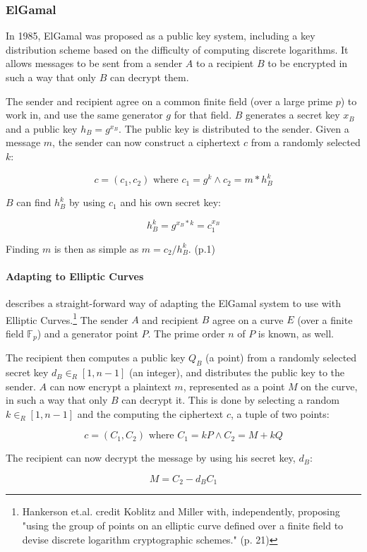 \subsubsection{ElGamal}

In 1985, ElGamal was proposed as a public key system, including a key distribution scheme based
on the difficulty of computing discrete logarithms. It allows messages to be sent from a sender
\(A\) to a recipient \(B\) to be encrypted in such a way that only \(B\) can decrypt them.

The sender and recipient agree on a common finite field (over a large prime \(p\)) to work in,
and use the same generator \(g\) for that field. \(B\) generates a secret key \(x_B\) and a public
key \(h_B = g^{x_B}\). The public key is distributed to the sender. Given a message \(m\), the
sender can now construct a ciphertext \(c\) from a randomly selected \(k\):

\begin{equation}
	c = (c_1, c_2)  \text{     where  }  c_1 = g^k \land c_2 = m * h_B^k
\end{equation}

\(B\) can find \(h_B^k\) by using \(c_1\) and his own secret key:

\begin{equation}
	h_B^k = g^{x_B*k} = c_1^{x_B}
\end{equation}

Finding \(m\) is then as simple as \(m = c_2/h_B^k\). \cite{elgamal} (p.1)

\paragraph{Adapting to Elliptic Curves}
\cite{hankerson2010} describes a straight-forward way of adapting the ElGamal system to use with
Elliptic Curves.\footnote{Hankerson et.al. credit Koblitz and Miller with, independently, proposing
"using the group of points on an elliptic curve defined over a finite field to devise discrete
logarithm cryptographic schemes." (p. 21)} The sender \(A\) and recipient \(B\) agree on a curve \(E\)
(over a finite field \(\mathbb{F}_p\)) and a generator point \(P\). The prime order \(n\) of \(P\) is
known, as well.

The recipient then computes a public key \(Q_B\) (a point) from a randomly selected secret key
\(d_B \in_R [1,n-1]\) (an integer), and distributes the public key to the sender. \(A\) can now encrypt
a plaintext \(m\), represented as a point \(M\) on the curve, in such a way that only \(B\) can decrypt
it. This is done by selecting a random \(k \in_R [1,n-1]\) and the computing the ciphertext \(c\), a
tuple of two points:

\begin{equation}
	c = (C_1, C_2)  \text{     where  }  C_1 = kP \land C_2 = M+kQ
\end{equation}

The recipient can now decrypt the message by using his secret key, \(d_B\):

\begin{equation}
	M = C_2 - d_B C_1
\end{equation}
